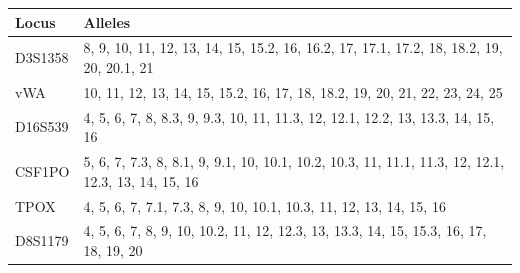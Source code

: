 \begin{theappendices}
\begin{table}[htbp]
\centering
\begin{tabularx}{\textwidth}{lX}
\toprule
   Locus &                                                                                                                                                                                                                                                                                                                                                      Alleles \\
\midrule
 D3S1358 &                                                                                                                                                                                                                                                                     8, 9, 10, 11, 12, 13, 14, 15, 15.2, 16, 16.2, 17, 17.1, 17.2, 18, 18.2, 19, 20, 20.1, 21 \\
     vWA &                                                                                                                                                                                                                                                                                   10, 11, 12, 13, 14, 15, 15.2, 16, 17, 18, 18.2, 19, 20, 21, 22, 23, 24, 25 \\
 D16S539 &                                                                                                                                                                                                                                                                               4, 5, 6, 7, 8, 8.3, 9, 9.3, 10, 11, 11.3, 12, 12.1, 12.2, 13, 13.3, 14, 15, 16 \\
  CSF1PO &                                                                                                                                                                                                                                                           5, 6, 7, 7.3, 8, 8.1, 9, 9.1, 10, 10.1, 10.2, 10.3, 11, 11.1, 11.3, 12, 12.1, 12.3, 13, 14, 15, 16 \\
    TPOX &                                                                                                                                                                                                                                                                                           4, 5, 6, 7, 7.1, 7.3, 8, 9, 10, 10.1, 10.3, 11, 12, 13, 14, 15, 16 \\
 D8S1179 &                                                                                                                                                                                                                                                                         4, 5, 6, 7, 8, 9, 10, 10.2, 11, 12, 12.3, 13, 13.3, 14, 15, 15.3, 16, 17, 18, 19, 20 \\

\end{tabularx}
\end{table}
\end{theappendices}
